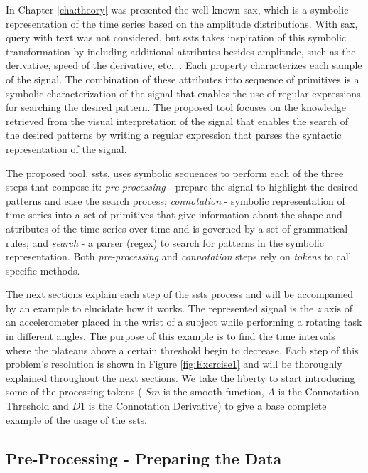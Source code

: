 In Chapter \ref{cha:theory} was presented the well-known \gls{sax}, which is a symbolic representation of the time series based on the amplitude distributions. With \gls{sax}, query with text was not considered, but \gls{ssts} takes inspiration of this symbolic transformation by including additional attributes besides amplitude, such as the derivative, speed of the derivative, etc.... Each property characterizes each sample of the signal. The combination of these attributes into sequence of primitives is a symbolic characterization of the signal that enables the use of regular expressions for searching the desired pattern. The proposed tool focuses on the knowledge retrieved from the visual interpretation of the signal that enables the search of the desired patterns by writing a regular expression that parses the syntactic representation of the signal.
\par
The proposed tool, \gls{ssts}, uses symbolic sequences to perform each of the three steps that compose it: \textit{pre-processing} - prepare the signal to highlight the desired patterns and ease the search process; \textit{connotation} - symbolic representation of time series into a set of primitives that give information about the shape and attributes of the time series over time and is governed by a set of grammatical rules; and \textit{search} - a parser (\gls{regex}) to search for patterns in the symbolic representation. Both \textit{pre-processing} and \textit{connotation} steps rely on \textit{tokens} to call specific methods.
\par
The next sections explain each step of the \gls{ssts} process and will be accompanied by an example to elucidate how it works. The represented signal is the \textit{z} axis of an accelerometer placed in the wrist of a subject while performing a rotating task in different angles. The purpose of this example is to find the time intervals where the plateaus above a certain threshold begin to decrease. Each step of this problem's resolution is shown in Figure \ref{fig:Exercise1} and will be thoroughly explained throughout the next sections. We take the liberty to start introducing some of the processing tokens ( $Sm$ is the smooth function, $A$ is the Connotation Threshold and $D1$ is the Connotation Derivative) to give a base complete example of the usage of the \gls{ssts}.


\subsection{Pre-Processing - Preparing the Data}

